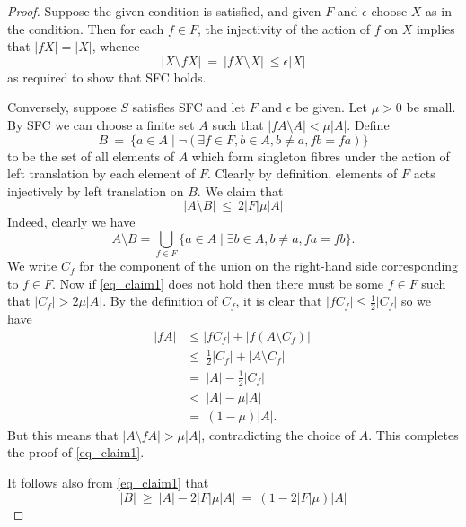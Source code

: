 \documentclass[11pt,a4paper,reqno]{amsart}
\begin{document}
\begin{proof}
Suppose the given condition is satisfied, and given $F$ and $\epsilon$ choose $X$ as in the condition. Then for each $f \in F$, the injectivity of the action of $f$ on $X$ implies that $|fX| = |X|$, whence
$$|X \setminus fX| \ = \ |fX \setminus X| \ \leq \epsilon |X|$$
as required to show that SFC holds.

Conversely, suppose $S$ satisfies SFC and let $F$ and $\epsilon$ be given. Let $\mu > 0$ be
small. By SFC we can choose a finite set $A$ such that $|fA \setminus A| < \mu |A|$. Define 
$$B \ = \ \lbrace a \in A \mid \lnot \left( \exists f \in F, b \in A, b \neq a, fb = fa \right) \rbrace$$
to be the set of all elements of $A$ which form singleton fibres under the action of left translation by
each element of $F$.
Clearly by definition, elements of $F$ acts injectively by left translation on $B$. We claim that
\begin{equation}\label{eq_claim1}
|A \setminus B| \ \leq \ 2 |F| \mu |A|
\end{equation}
Indeed, clearly we have
$$A \setminus B = \bigcup_{f \in F} \lbrace a \in A \mid \exists b \in A, b \neq a, fa = fb \rbrace.$$
We write $C_f$ for the component of the union on the right-hand side corresponding to $f \in F$.
Now if \eqref{eq_claim1} does not hold then there must be some $f \in F$ such that $|C_f| > 2 \mu |A|$.
By the definition of $C_f$, it is clear that $|f C_f| \leq \frac{1}{2} |C_f|$ so we have
\begin{align*}
|fA| &\leq |f C_f| + |f (A \setminus C_f)| \ \\
&\leq \ \frac{1}{2} |C_f| + |A \setminus C_f| \\
&= \ |A| - \frac{1}{2} |C_f| \\
&< \ |A| - \mu |A| \\
&= \ (1- \mu) |A|.
\end{align*}
But this means that
$|A \setminus fA| > \mu |A|$, contradicting the choice of $A$. This completes the proof of
\eqref{eq_claim1}. 

It follows also from \eqref{eq_claim1} that
\begin{equation}\label{eq_claim2}
|B| \ \geq \ |A| - 2|F| \mu |A| \ = \ (1-2|F| \mu) |A|
\end{equation}


\end{proof}
\end{document}
